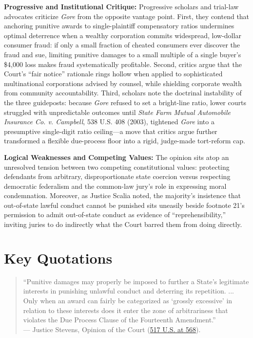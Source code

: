 \documentclass[12pt]{article}
\begin{document}
\textbf{Progressive and Institutional Critique:} Progressive scholars and trial-law advocates criticize \textit{Gore} from the opposite vantage point. First, they contend that anchoring punitive awards to single-plaintiff compensatory ratios undermines optimal deterrence when a wealthy corporation commits widespread, low-dollar consumer fraud: if only a small fraction of cheated consumers ever discover the fraud and sue, limiting punitive damages to a small multiple of a single buyer's \$4,000 loss makes fraud systematically profitable. Second, critics argue that the Court's ``fair notice'' rationale rings hollow when applied to sophisticated multinational corporations advised by counsel, while shielding corporate wealth from community accountability. Third, scholars note the doctrinal instability of the three guideposts: because \textit{Gore} refused to set a bright-line ratio, lower courts struggled with unpredictable outcomes until \textit{State Farm Mutual Automobile Insurance Co. v. Campbell}, 538 U.S. 408 (2003), tightened \textit{Gore} into a presumptive single-digit ratio ceiling---a move that critics argue further transformed a flexible due-process floor into a rigid, judge-made tort-reform cap.

\textbf{Logical Weaknesses and Competing Values:} The opinion sits atop an unresolved tension between two competing constitutional values: protecting defendants from arbitrary, disproportionate state coercion versus respecting democratic federalism and the common-law jury's role in expressing moral condemnation. Moreover, as Justice Scalia noted, the majority's insistence that out-of-state lawful conduct cannot be punished sits uneasily beside footnote 21's permission to admit out-of-state conduct as evidence of ``reprehensibility,'' inviting juries to do indirectly what the Court barred them from doing directly.

\section{Key Quotations}

\begin{quote}
``Punitive damages may properly be imposed to further a State's legitimate interests in punishing unlawful conduct and deterring its repetition. ... Only when an award can fairly be categorized as `grossly excessive' in relation to these interests does it enter the zone of arbitrariness that violates the Due Process Clause of the Fourteenth Amendment.'' \\
--- Justice Stevens, Opinion of the Court (\href{https://supreme.justia.com/cases/federal/us/517/559/}{517 U.S. at 568}).
\end{quote}
\end{document}
